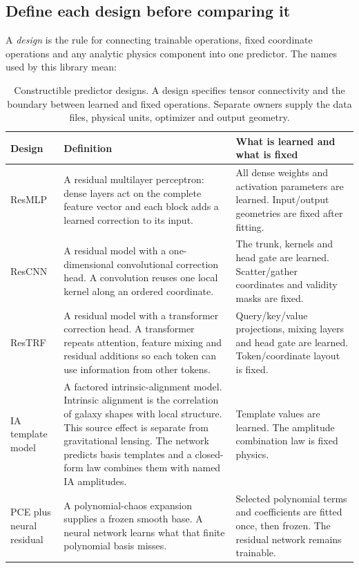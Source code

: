 \documentclass[10pt,aps,prd,twocolumn,nofootinbib]{revtex4-2}
\begin{document}
\subsection{Define each design before comparing it}

A \emph{design} is the rule for connecting trainable operations, fixed
coordinate operations and any analytic physics component into one predictor.
The names used by this library mean:

\begin{table}[t]
\centering
\begin{tabular}{p{}p{}p{}}
\toprule
Design & Definition & What is learned and what is fixed \\
\midrule
ResMLP & A residual multilayer perceptron: dense layers act on the complete
feature vector and each block adds a learned correction to its input. & All
dense weights and activation parameters are learned.  Input/output geometries
are fixed after fitting.  \\
ResCNN & A residual model with a one-dimensional convolutional correction
head.  A convolution reuses one local kernel along an ordered coordinate. &
The trunk, kernels and head gate are learned.  Scatter/gather coordinates and
validity masks are fixed.  \\
ResTRF & A residual model with a transformer correction head.  A transformer
repeats attention, feature mixing and residual additions so each token can
use information from other tokens. & Query/key/value projections, mixing
layers and head gate are learned.  Token/coordinate layout is fixed.  \\
IA template model & A factored intrinsic-alignment model.  Intrinsic alignment
is the correlation of galaxy shapes with local structure.  This source effect
is separate from gravitational lensing.  The network predicts basis templates
and a closed-form law combines them with named IA amplitudes. & Template values
are learned.  The amplitude
combination law is fixed physics.  \\
PCE plus neural residual & A polynomial-chaos expansion supplies a frozen
smooth base.  A neural network learns what that finite polynomial basis misses.
& Selected polynomial terms and coefficients are fitted once, then frozen.
The residual network remains trainable.  \\
\bottomrule
\end{tabular}
\caption{Constructible predictor designs.  A design specifies tensor
connectivity and the boundary between learned and fixed operations.  Separate
owners supply the data files, physical units, optimizer and output geometry.}
\label{tab:model-designs}
\end{table}
\end{document}
